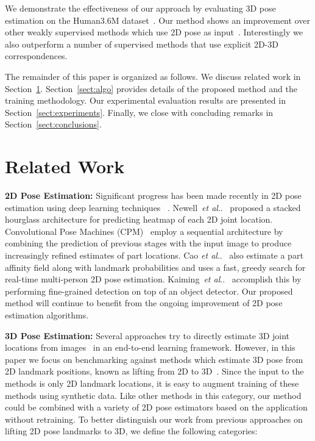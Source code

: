 \documentclass[runningheads]{llncs}
\makeatletter
\DeclareRobustCommand\onedot{\futurelet\@let@token\@onedot}
\def\@onedot{\ifx\@let@token.\else.\null\fi\xspace}
\def\etal{\emph{et al}\onedot}
\makeatother
\begin{document}
We demonstrate the effectiveness of our approach by evaluating 3D pose estimation on the Human3.6M dataset~\cite{h36m}. Our method shows an improvement over other weakly supervised methods which use 2D pose as input~\cite{Tung_2017_ICCV,InterpreterNetwork2016}. Interestingly we also outperform a number of supervised methods that use explicit 2D-3D correspondences.

The remainder of this paper is organized as follows. We discuss related work in Section~\ref{sect:related_work}. Section~\ref{sect:algo} provides details of the proposed method and the training methodology. Our experimental evaluation results are presented in Section~\ref{sect:experiments}. Finally, we close with concluding remarks in Section~\ref{sect:conclusions}.



\section{Related Work}\label{sect:related_work}\textbf{2D Pose Estimation:} Significant progress has been made recently in 2D pose estimation using deep learning techniques ~\cite{cpm,stacked-hourglass,PartAffinityCVPR2017,mask-rcnn}. Newell~\etal~\cite{stacked-hourglass} proposed a stacked hourglass architecture for predicting heatmap of each 2D joint location. Convolutional Pose Machines (CPM)~\cite{cpm} employ a sequential architecture by combining the prediction of previous stages with the input image to produce increasingly refined estimates of part locations. Cao \etal~\cite{PartAffinityCVPR2017} also estimate a part affinity field along with landmark probabilities and uses a fast, greedy search for real-time multi-person 2D pose estimation. Kaiming~\etal~\cite{mask-rcnn} accomplish this by performing fine-grained detection on top of an object detector. Our proposed method will continue to benefit from the ongoing improvement of 2D pose estimation algorithms.

\textbf{3D Pose Estimation:} Several approaches try to directly estimate 3D joint locations from images~\cite{Pavlakos_2017_CVPR,park20163d,Rogez_2017_CVPR,Towards_wild_Zhou,mehta2017vnect} in an end-to-end learning framework. However, in this paper we focus on benchmarking against methods which estimate 3D pose from 2D landmark positions, {known as} lifting from 2D to 3D~\cite{MartinezICCV2017,Tung_2017_ICCV,ChenDeva2017}. Since the input to the methods is only 2D landmark locations, it is easy to augment training of these methods using synthetic data. Like other methods in this category, our method could be combined with a variety of 2D pose estimators based on the application without retraining.
To better distinguish our work from previous approaches on lifting 2D pose landmarks to 3D, we define the following categories:
\end{document}
